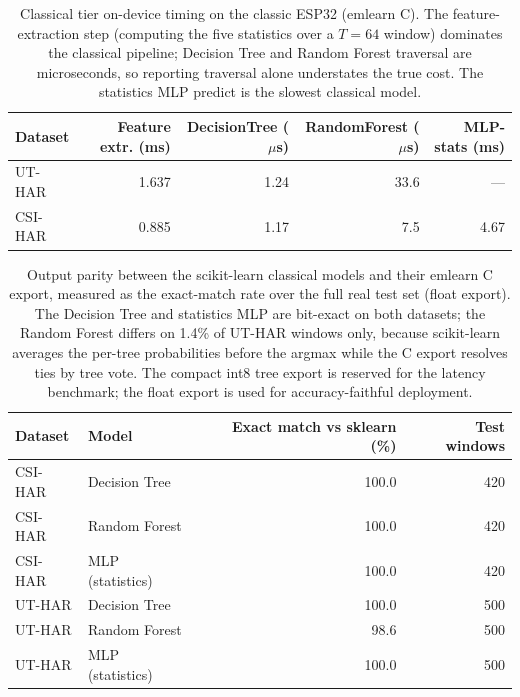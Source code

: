 \begin{table}[t]
\centering
\caption{Classical tier on-device timing on the classic ESP32 (emlearn C). The
feature-extraction step (computing the five statistics over a $T{=}64$ window)
dominates the classical pipeline; Decision Tree and Random Forest traversal are
microseconds, so reporting traversal alone understates the true cost. The
statistics MLP predict is the slowest classical model.}
\label{tab:classical-timing}
\begin{tabular}{lrrrr}
\hline
Dataset & Feature extr. (ms) & DecisionTree ($\mu$s) & RandomForest ($\mu$s) & MLP-stats (ms) \\
\hline
UT-HAR  & 1.637 & 1.24 & 33.6 & --- \\
CSI-HAR & 0.885 & 1.17 & 7.5  & 4.67 \\
\hline
\end{tabular}
\end{table}

\begin{table}[t]
\centering
\caption{Output parity between the scikit-learn classical models and their emlearn C export,
measured as the exact-match rate over the full real test set (float export). The Decision Tree
and statistics MLP are bit-exact on both datasets; the Random Forest differs on 1.4\% of UT-HAR
windows only, because scikit-learn averages the per-tree probabilities before the argmax while the
C export resolves ties by tree vote. The compact int8 tree export is reserved for the latency
benchmark; the float export is used for accuracy-faithful deployment.}
\label{tab:emlearn-parity}
\begin{tabular}{llrr}
\hline
Dataset & Model & Exact match vs sklearn (\%) & Test windows \\
\hline
CSI-HAR & Decision Tree   & 100.0 & 420 \\
CSI-HAR & Random Forest   & 100.0 & 420 \\
CSI-HAR & MLP (statistics)& 100.0 & 420 \\
UT-HAR  & Decision Tree   & 100.0 & 500 \\
UT-HAR  & Random Forest   & 98.6  & 500 \\
UT-HAR  & MLP (statistics)& 100.0 & 500 \\
\hline
\end{tabular}
\end{table}

